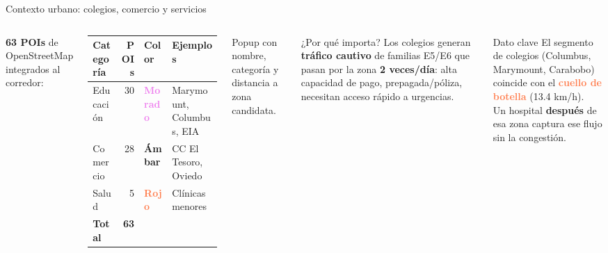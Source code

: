 \documentclass[aspectratio=169, 11pt]{beamer}
\newcommand{\danger}[1]{\textcolor{coral}{\textbf{#1}}}
\newcommand{\src}[1]{\par\vspace{2pt}{\tiny\textcolor{slate}{Fuente: #1}}}
\begin{document}
\begin{frame}{Contexto urbano: colegios, comercio y servicios}

\begin{columns}[T]
\textbf{63 POIs} de OpenStreetMap integrados al corredor:

\vspace{6pt}
{\footnotesize
\begin{tabular}{@{}lrll@{}}
\toprule
\textbf{Categoría} & \textbf{POIs} & \textbf{Color} & \textbf{Ejemplos} \\
\midrule
Educación & 30 & \textcolor{violet}{\textbf{Morado}} & Marymount, Columbus, EIA \\
Comercio & 28 & \textcolor{amber}{\textbf{Ámbar}} & CC El Tesoro, Oviedo \\
Salud & 5 & \textcolor{coral}{\textbf{Rojo}} & Clínicas menores \\
\midrule
\textbf{Total} & \textbf{63} & & \\
\bottomrule
\end{tabular}
}

\vspace{4pt}
{\scriptsize Popup con nombre, categoría y distancia a zona candidata.}
\src{OpenStreetMap Overpass API, 1,323 POIs descargados, 63 en corredor}

\begin{block}{\small ¿Por qué importa?}
\footnotesize Los colegios generan \textbf{tráfico cautivo} de familias E5/E6 que pasan por la zona \textbf{2 veces/día}: alta capacidad de pago, prepagada/póliza, necesitan acceso rápido a urgencias.
\end{block}

\vspace{4pt}
\begin{exampleblock}{\small Dato clave}
\footnotesize El segmento de colegios (Columbus, Marymount, Carabobo) coincide con el \danger{cuello de botella} (13.4 km/h).\\[3pt]
Un hospital \textbf{después} de esa zona captura ese flujo sin la congestión.
\end{exampleblock}
\end{columns}
\end{frame}
\end{document}
